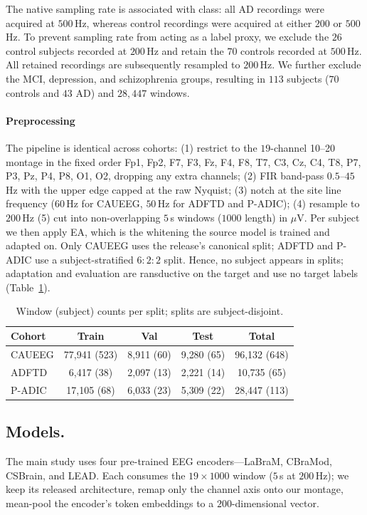 \documentclass[letterpaper]{article} %
\begin{document}
The native sampling rate is associated with class: all AD recordings were acquired at $500$\,Hz, whereas control recordings were acquired at either $200$ or $500$\,Hz. To prevent sampling rate from acting as a label proxy, we exclude the $26$ control subjects recorded at $200$\,Hz and retain the $70$ controls recorded at $500$\,Hz. All retained recordings are subsequently resampled to $200$\,Hz. We further exclude the MCI, depression, and schizophrenia groups, resulting in $113$ subjects ($70$ controls and $43$ AD) and $28{,}447$ windows.

\paragraph{Preprocessing} The pipeline is identical across cohorts: (1) restrict to the $19$-channel 10--20 montage in the fixed order Fp1, Fp2, F7, F3, Fz, F4, F8, T7, C3, Cz, C4, T8, P7, P3, Pz, P4, P8, O1, O2, dropping any extra channels; (2) FIR band-pass $0.5$--$45$\,Hz with the upper edge capped at the raw Nyquist; (3) notch at the site line frequency ($60$\,Hz for CAUEEG, $50$\,Hz for ADFTD and P-ADIC); (4) resample to $200$\,Hz (5) cut into non-overlapping $5$\,s windows ($1000$ length) in $\mu$V. Per subject we then apply EA\cite{he2019transfer}, which is the whitening the source model is trained and adapted on. Only CAUEEG uses the release's canonical split; ADFTD and P-ADIC use a subject-stratified $6{:}2{:}2$ split. Hence, no subject appears in splits; adaptation and evaluation are ransductive on the target and use no target labels (Table~\ref{tab:datasets}).


\begin{table}[t]\centering\small
\setlength{\tabcolsep}{3pt}
\begin{tabular}{lcccc}
\toprule
Cohort & Train & Val & Test & Total \\
\midrule
CAUEEG & 77{,}941 (523) & 8{,}911 (60) & 9{,}280 (65) & 96{,}132 (648) \\
ADFTD  &  6{,}417 (38)  & 2{,}097 (13) & 2{,}221 (14) & 10{,}735 (65)  \\
P-ADIC & 17{,}105 (68)  & 6{,}033 (23) & 5{,}309 (22) & 28{,}447 (113) \\
\bottomrule
\end{tabular}
\caption{Window (subject) counts per split; splits are subject-disjoint.}
\label{tab:datasets}
\end{table}



\subsection{Models.}
The main study uses four pre-trained EEG encoders---LaBraM, CBraMod, CSBrain, and LEAD. Each consumes the $19{\times}1000$ window ($5$\,s at $200$\,Hz); we keep its released architecture, remap only the channel axis onto our montage, mean-pool the encoder's token embeddings to a $200$-dimensional vector.
\end{document}
